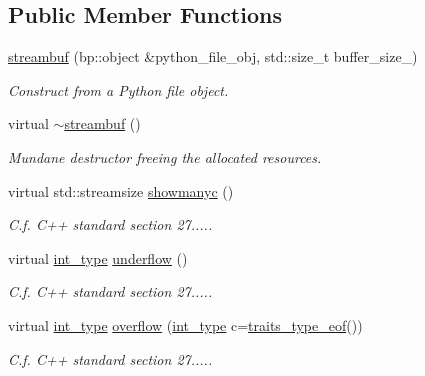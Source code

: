 \subsection*{Public Member Functions}
\begin{DoxyCompactItemize}
\item 
\hyperlink{classecto_1_1py_1_1streambuf_a363d9b87292423903bc5fe94782ad6e0}{streambuf} (bp\-::object \&python\-\_\-file\-\_\-obj, std\-::size\-\_\-t buffer\-\_\-size\-\_)
\begin{DoxyCompactList}\small\item\em Construct from a Python file object. \end{DoxyCompactList}\item 
virtual \hyperlink{classecto_1_1py_1_1streambuf_a3a63f6d4610731b218bcdca5603a51ef}{$\sim$streambuf} ()
\begin{DoxyCompactList}\small\item\em Mundane destructor freeing the allocated resources. \end{DoxyCompactList}\item 
virtual std\-::streamsize \hyperlink{classecto_1_1py_1_1streambuf_aba2bcdbeeee00b043f918e60f86ebdd4}{showmanyc} ()
\begin{DoxyCompactList}\small\item\em C.\-f. C++ standard section 27..... \end{DoxyCompactList}\item 
virtual \hyperlink{classecto_1_1py_1_1streambuf_a1bfd3d3f54b7b91a5ea54f980436a617}{int\-\_\-type} \hyperlink{classecto_1_1py_1_1streambuf_adf2601f0f067538a980dced85e8f8d2e}{underflow} ()
\begin{DoxyCompactList}\small\item\em C.\-f. C++ standard section 27..... \end{DoxyCompactList}\item 
virtual \hyperlink{classecto_1_1py_1_1streambuf_a1bfd3d3f54b7b91a5ea54f980436a617}{int\-\_\-type} \hyperlink{classecto_1_1py_1_1streambuf_a6eb250e56b6bbc9345b4f00981e4182f}{overflow} (\hyperlink{classecto_1_1py_1_1streambuf_a1bfd3d3f54b7b91a5ea54f980436a617}{int\-\_\-type} c=\hyperlink{classecto_1_1py_1_1streambuf_ab4446bbe746f4d3713c15492d798872e}{traits\-\_\-type\-\_\-eof}())
\begin{DoxyCompactList}\small\item\em C.\-f. C++ standard section 27..... \end{DoxyCompactList}\item 

\end{DoxyCompactItemize}
